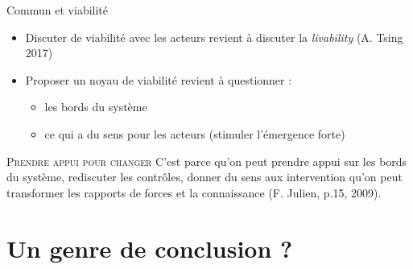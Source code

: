 \documentclass[newPxFont]{beamer}
\begin{document}
\begin{frame}[c]{Commun et viabilité}
      \vspace{-1cm}
      \begin{itemize}
        \item Discuter de viabilité avec les acteurs revient à discuter la \textit{livability} (A. Tsing 2017)
        \item Proposer un noyau de viabilité revient à questionner :
        \begin{itemize}
          \item les bords du système
          \item ce qui a du sens pour les acteurs (stimuler l'émergence forte)
        \end{itemize}
      \end{itemize}
      \small{
         \begin{alertblock}{\textsc{Prendre appui pour changer}}
          C'est parce qu'on peut prendre appui sur les bords du système, rediscuter les contrôles, donner du sens aux intervention qu'on peut transformer les rapports de forces et la connaissance (F. Julien, p.15, 2009).
         \end{alertblock}
       }
\end{frame}


\section{Un genre de conclusion ?}
\end{document}
